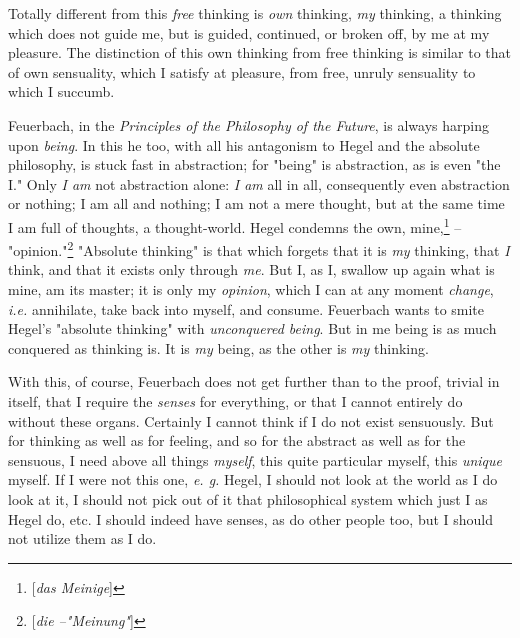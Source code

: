 Totally different from this \textit{free} thinking is \textit{own} thinking, 
\textit{my} thinking, a thinking which does not guide me, but is guided, 
continued, or broken off, by me at my pleasure. The distinction of this own 
thinking from free thinking is similar to that of own sensuality, which I 
satisfy at pleasure, from free, unruly sensuality to which I succumb.

Feuerbach, in the \textit{Principles of the Philosophy of the Future}, is 
always harping upon \textit{being}. In this he too, with all his antagonism to 
Hegel and the absolute philosophy, is stuck fast in abstraction; for 
"{}being"{} is abstraction, as is even "{}the I."{} Only \textit{I am} not 
abstraction alone: \textit{I am} all in all, consequently even abstraction or 
nothing; I am all and nothing; I am not a mere thought, but at the same time I 
am full of thoughts, a thought-world. Hegel condemns the own, 
mine,\footnote{[\textit{das Meinige}]} -- "{}opinion."{}\footnote{[\textit{die 
--"{}Meinung"{}}]} "{}Absolute thinking"{} is that which forgets that it is 
\textit{my} thinking, that \textit{I} think, and that it exists only through 
\textit{me}. But I, as I, swallow up again what is mine, am its master; it is 
only my \textit{opinion}, which I can at any moment \textit{change}, 
\textit{i.e.} annihilate, take back into myself, and consume. Feuerbach wants 
to smite Hegel's "{}absolute thinking"{} with \textit{unconquered being}. But 
in me being is as much conquered as thinking is. It is \textit{my} being, as 
the other is \textit{my} thinking.

With this, of course, Feuerbach does not get further than to the proof, 
trivial in itself, that I require the \textit{senses} for everything, or that 
I cannot entirely do without these organs. Certainly I cannot think if I do 
not exist sensuously. But for thinking as well as for feeling, and so for the 
abstract as well as for the sensuous, I need above all things \textit{myself}, 
this quite particular myself, this \textit{unique} myself. If I were not this 
one, \textit{e. g.} Hegel, I should not look at the world as I do look at it, 
I should not pick out of it that philosophical system which just I as Hegel 
do, etc. I should indeed have senses, as do other people too, but I should not 
utilize them as I do.

